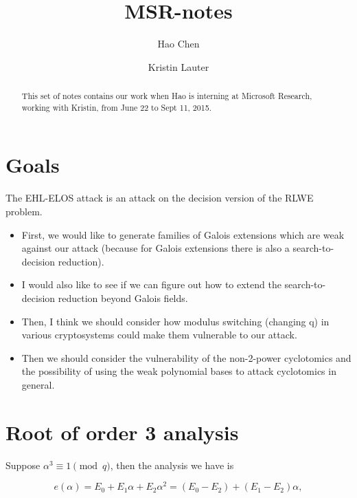 \documentclass{amsart}
\title{MSR-notes}
\author{Hao Chen \and Kristin Lauter}
\begin{document}
\maketitle

\begin{abstract}
This set of notes contains our work when Hao is interning at
Microsoft Research, working with Kristin, from June 22 to Sept 11, 2015.
\end{abstract}







\section{Goals}

The EHL-ELOS attack is an attack on the decision version of the RLWE problem.

\begin{itemize}

\item First, we would like to generate families of Galois extensions which are weak against our attack (because for Galois extensions there is also a search-to-decision reduction).






\item I would also like to see if we can figure out how to extend the search-to-decision reduction beyond Galois fields.


\item Then, I think we should consider how modulus switching (changing q) in various cryptosystems could make them vulnerable to our attack.


\item Then we should consider the vulnerability of the non-2-power cyclotomics and the possibility of using the weak polynomial bases to attack cyclotomics in general.
\end{itemize}

\newpage


\section{Root of order 3 analysis}

Suppose $\alpha^3 \equiv 1 \pmod{q}$, then the analysis we have is

$$e(\alpha) = E_0 + E_1\alpha + E_2\alpha^2 = (E_0 - E_2) +(E_1 - E_2)\alpha, $$
\end{document}
